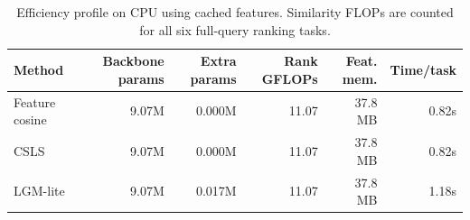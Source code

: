 \begin{table}[!t]
\centering
\footnotesize
\caption{Efficiency profile on CPU using cached features. Similarity FLOPs are counted for all six full-query ranking tasks.}
\label{tab:publication_efficiency}
\begin{tabular}{lrrrrr}
\toprule
Method & Backbone params & Extra params & Rank GFLOPs & Feat. mem. & Time/task \\
\midrule
Feature cosine & 9.07M & 0.000M & 11.07 & 37.8 MB & 0.82s \\
CSLS & 9.07M & 0.000M & 11.07 & 37.8 MB & 0.82s \\
LGM-lite & 9.07M & 0.017M & 11.07 & 37.8 MB & 1.18s \\
\bottomrule
\end{tabular}
\end{table}
